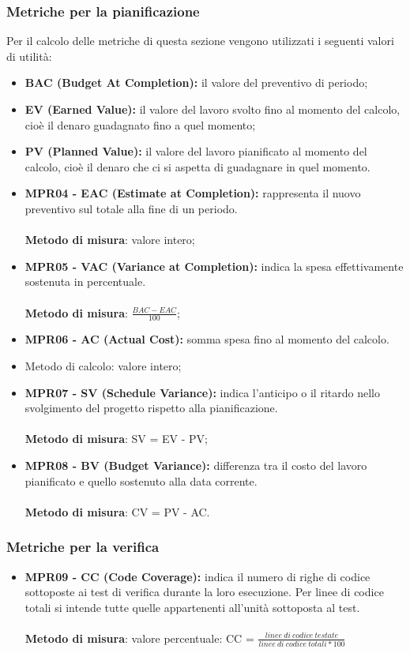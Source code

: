 \subsubsection{Metriche per la pianificazione}
Per il calcolo delle metriche di questa sezione vengono utilizzati i seguenti valori di utilità:
\begin{itemize}
    \item \textbf{BAC (Budget At Completion):} il valore del preventivo di periodo;
    \item \textbf{EV (Earned Value):}  il valore del lavoro svolto fino al momento del calcolo, cioè il denaro guadagnato fino a quel momento;
    \item \textbf{PV (Planned Value):} il valore del lavoro pianificato al momento del calcolo, cioè il denaro che ci si aspetta di guadagnare in quel momento.
\end{itemize}
\begin{itemize}
    \item \textbf{MPR04 - EAC (Estimate at Completion):} rappresenta il nuovo preventivo sul totale alla fine di un periodo.\\
    \\\textbf{Metodo di misura}: valore intero;
    \item \textbf{MPR05 - VAC (Variance at Completion):} indica la spesa effettivamente sostenuta in percentuale.\\
    \\\textbf{Metodo di misura}: $\frac{BAC - EAC}{100}$;
    \item \textbf{MPR06 - AC (Actual Cost):} somma spesa fino al momento del calcolo.\\
    \item Metodo di calcolo: valore intero;
    \item \textbf{MPR07 - SV (Schedule Variance):} indica l'anticipo o il ritardo nello svolgimento del progetto rispetto alla pianificazione.\\
    \\\textbf{Metodo di misura}: SV = EV - PV;
    \item \textbf{MPR08 - BV (Budget Variance):} differenza tra il costo del lavoro pianificato e quello sostenuto alla data corrente.\\
    \\\textbf{Metodo di misura}: CV = PV - AC.
\end{itemize}

\subsubsection{Metriche per la verifica}
\begin{itemize}
    \item \textbf{MPR09 - CC (Code Coverage):} indica il numero di righe di codice sottoposte ai test di verifica durante la loro esecuzione. Per linee di codice totali
    si intende tutte quelle appartenenti all'unità sottoposta al test.\\
    \\\textbf{Metodo di misura}: valore percentuale: CC = $\frac{linee \ di \ codice \ testate}{linee \ di \ codice \ totali * 100}$
\end{itemize}

